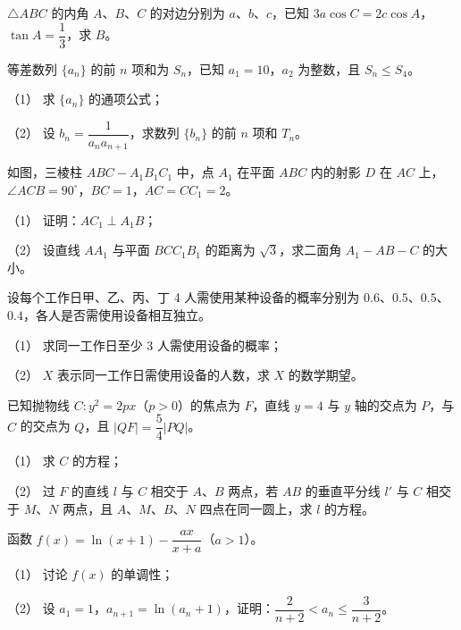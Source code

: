 \begin{question}
$\triangle ABC$ 的内角 $A$、$B$、$C$ 的对边分别为 $a$、$b$、$c$，已知 $3a\cos C=2c\cos A$，$\tan A=\dfrac13$，求 $B$。

\end{question}
\begin{question}
等差数列 $\{a_n\}$ 的前 $n$ 项和为 $S_n$，已知 $a_1=10$，$a_2$ 为整数，且 $S_n\leqslant S_4$。

（1） 求 $\{a_n\}$ 的通项公式；

（2） 设 $b_n=\dfrac{1}{a_na_{n+1}}$，求数列 $\{b_n\}$ 的前 $n$ 项和 $T_n$。

\Needspace{0.4\textheight}
\end{question}
\begin{question}
如图，三棱柱 $ABC-A_1B_1C_1$ 中，点 $A_1$ 在平面 $ABC$ 内的射影 $D$ 在 $AC$ 上，$\angle ACB=90^\circ$，$BC=1$，$AC=CC_1=2$。
\nopagebreak[4]
\begin{center}\end{center}
\nopagebreak[4]
（1） 证明：$AC_1\perp A_1B$；

（2） 设直线 $AA_1$ 与平面 $BCC_1B_1$ 的距离为 $\sqrt3$，求二面角 $A_1-AB-C$ 的大小。

\end{question}
\begin{question}
设每个工作日甲、乙、丙、丁 4 人需使用某种设备的概率分别为 $0.6$、$0.5$、$0.5$、$0.4$，各人是否需使用设备相互独立。

（1） 求同一工作日至少 3 人需使用设备的概率；

（2） $X$ 表示同一工作日需使用设备的人数，求 $X$ 的数学期望。

\end{question}
\begin{question}
已知抛物线 $C:y^2=2px$（$p>0$）的焦点为 $F$，直线 $y=4$ 与 $y$ 轴的交点为 $P$，与 $C$ 的交点为 $Q$，且 $|QF|=\dfrac54|PQ|$。

（1） 求 $C$ 的方程；

（2） 过 $F$ 的直线 $l$ 与 $C$ 相交于 $A$、$B$ 两点，若 $AB$ 的垂直平分线 $l'$ 与 $C$ 相交于 $M$、$N$ 两点，且 $A$、$M$、$B$、$N$ 四点在同一圆上，求 $l$ 的方程。

\end{question}
\begin{question}
函数 $f(x)=\ln(x+1)-\dfrac{ax}{x+a}$（$a>1$）。

（1） 讨论 $f(x)$ 的单调性；

（2） 设 $a_1=1$，$a_{n+1}=\ln(a_n+1)$，证明：$\dfrac{2}{n+2}<a_n\leqslant\dfrac{3}{n+2}$。

\end{question}